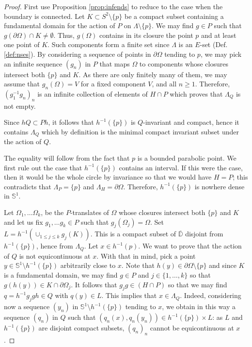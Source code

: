\documentclass[11pt]{article}
\theoremstyle{definition}
\begin{document}
\begin{proof}  First use Proposition \ref{prop:infends} to reduce to the case when the boundary is connected. 
Let $K\subset S^2\setminus\{p\}$ be a compact subset containing a fundamental domain for the action
of $P$ on $\Lambda\setminus\{p\}$.  We may find
$g\in P$ such that $g(\partial\Omega)\cap K\ne \emptyset$. 
Thus, $g(\Omega)$ contains in its closure
the point $p$ and at least one point of $K$. Such components form a finite set since $\Lambda$ is an $E$-set (Def. \ref{def:nses}). 
By considering a sequence of points in $\partial\Omega$ tending to $p$, we may pick an infinite sequence $(g_n)$ in $P$ that
maps $\Omega$ to components whose closures intersect both $\{p\}$ and $K$.
As there are only finitely many of them,  we may assume that $g_n(\Omega)=V$ for a fixed component 
$V$,
and all $n\ge 1$. Therefore, $(g_1^{-1}g_n)_n$
is an infinite collection of elements of $H\cap P$ which proves that $\Lambda_Q$ is not empty.

Since $hQ\subset Ph$, it follows that $h^{-1}(\{p\})$ is $Q$-invariant and compact, hence it contains
$\Lambda_Q$ which by definition is the minimal  compact invariant subset under the action of $Q$. 

The equality will follow from the fact that $p$ is a bounded parabolic point. We first rule out the case that $h^{-1}(\{p\})$ contains
an interval. If this were the case, then it would be the whole circle by invariance so that we would have $H=P$; this
contradicts that $\Lambda_P=\{p\}$ and $\Lambda_H=\partial\Omega$. 
Therefore, $h^{-1}(\{p\})$ is nowhere dense in $\mathbb{S}^1$.

Let $\Omega_1,\ldots \Omega_k$, be the $P$-translates
of $\Omega$ whose closures intersect both $\{p\}$ and $K$ and let us fix $g_1,\ldots g_k\in P$ such that
$g_j(\Omega_j)= \Omega$. Set $L= h^{-1}(\cup_{1\le j\le k} g_j(K))$.  This is a compact subset of $\overline{\mathbb{D}}$ disjoint from $h^{-1}(\{p\})$, hence from $\Lambda_Q$.
Let $x\in h^{-1}(p)$.  
We want to prove that the action of $Q$ is not equicontinuous at $x$.
With that in mind,
pick a point $y\in\mathbb{S}^1\setminus h^{-1}(\{p\})$ arbitrarily close to $x$. 
Note that $h(y)\in\partial\Omega\setminus\{p\}$ and since $K$ is a fundamental domain, we may find $g\in P$ and $j\in\{1,\ldots, k\}$ so that $g(h(y))\in K\cap\partial\Omega_j$.
It follows that $g_jg\in (H\cap P)$ so that we may find $q= h^{-1}g_jgh\in Q$ with $q(y)\in L$. This implies that $x\in\Lambda_Q$. 
Indeed, considering now a sequence $(y_n)$ in $\mathbb{S}^1\setminus h^{-1}(\{p\})$ tending to $x$, we obtain in this way a sequence $(q_n)$ in $Q$ such that $(q_n(x), q_n(y_n))\in h^{-1}(\{p\})\times L$: as $L$ and  $h^{-1}(\{p\})$ are disjoint compact subsets, $(q_n)_n$ cannot be equicontinuous at $x$.
\end{proof}
\end{document}
